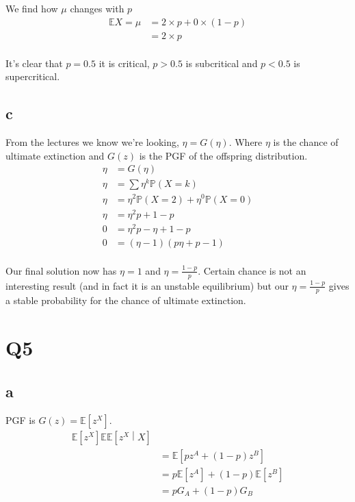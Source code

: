 \documentclass{article}
\newcommand{\prob}{\mathbb{P}}
\newcommand{\expect}{\mathbb{E}}
\begin{document}
We find how $\mu$ changes with $p$
\begin{align*}
    \expect X = \mu &= 2 \times p + 0 \times (1 - p) \\
    &= 2 \times p \\
\end{align*}

It's clear that $p = 0.5$ it is critical, $p > 0.5$ is subcritical and
$p < 0.5$ is supercritical.

\subsection{c}
From the lectures we know we're looking, $\eta = G(\eta)$. Where $\eta$ is
the chance of ultimate extinction and $G(z)$ is the PGF of the offspring
distribution.
\begin{align*}
    \eta &= G(\eta) \\
    \eta &= \sum \eta^k \prob(X=k) \\
    \eta &= \eta^2 \prob(X=2) + \eta^0 \prob(X=0) \\
    \eta &= \eta^2 p + 1 - p \\
    0 &= \eta^2 p - \eta + 1 - p \\
    0 &= (\eta - 1)(p \eta + p - 1)  \\
\end{align*}

Our final solution now has $\eta = 1$ and $\eta = \frac{1-p}{p}$.
Certain chance is not an interesting result (and in fact it is an unstable
equilibrium) but our $\eta = \frac{1-p}{p}$ gives a stable probability
for the chance of ultimate extinction.

\section{Q5}
\subsection{a}
PGF is $G(z) = \expect \left[z^X\right]$.
\begin{align*}
    \expect \left[z^X\right]
    \expect \expect \left[z^X \middle| X \right] \\
    &= \expect \left[pz^A + (1-p)z^B\right] \\
    &= p \expect\left[z^A\right] + (1-p) \expect \left[z^B\right] \\
    &= p G_A + (1-p) G_B \\
\end{align*}
\end{document}
